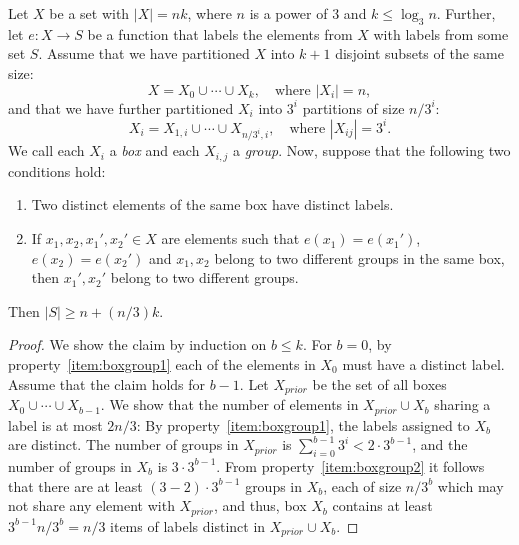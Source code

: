 \begin{lemma}\label{lemma:boxgroups}
Let $X$ be a set with $|X|=nk$, where $n$ is a power of $3$ and $k\leq \log_3 n$. Further, let $e\colon X\to S$ be a function that labels the elements from $X$ with labels from some set $S$. Assume that we have partitioned $X$ into $k+1$ disjoint subsets of the same size:
\[
X=X_0\cup\cdots \cup X_k, \quad \text{where $|X_i|=n$},
\]
and that we have further partitioned $X_i$ into  $3^i$  partitions of size $n/3^i$:
\[
X_i = X_{1,i}\cup\cdots\cup X_{n/3^i,i}, \quad \text{where $|X_{ij}|=3^i$.}
\]
We call each $X_i$ a \emph{box} and each $X_{i,j}$ a \emph{group}. Now, suppose that the following two conditions hold:
\begin{enumerate}[\normalfont (i)]
\item \label{item:boxgroup1} Two distinct elements of the same box have distinct labels.
\item \label{item:boxgroup2} If $x_1,x_2,x_1',x_2'\in X$ are elements such that $e(x_1)=e(x_1')$, $e(x_2)=e(x_2')$ and $x_1,x_2$ belong to two different groups in the same box, then $x_1',x_2'$ belong to two different groups.
\end{enumerate}
Then $|S|\geq n+(n/3)k$.
\end{lemma}
\begin{proof}
We show the claim by induction on $b \leq k$. 
For $b=0$,  by property~\eqref{item:boxgroup1}  each  of the elements in $X_0$ must have a  distinct label.
Assume that the claim holds for $b-1$.
Let $X_{prior}$ be the set of all boxes $X_0 \cup \cdots \cup X_{b-1}$.
We  show that the number of  elements in $X_{prior} \cup X_b$ sharing a label is at most $2n/3$:
 By property~\eqref{item:boxgroup1},  the labels assigned to $X_b$ are distinct.
The number of groups in $X_{prior}$ is $\sum_{i=0}^{b-1} 3^i < 2 \cdot 3^{b-1}$, and the number of groups in $X_b$ is $3 \cdot 3^{b-1}$.
From property~\eqref{item:boxgroup2} it follows that there are at least $(3-2)\cdot 3^{b-1}$ groups in $X_b$, each of size $n/3^b$ which may not share any element with $X_{prior}$, and thus, box $X_b$ contains at least $3^{b-1} n/3^b = n/3$ items of labels distinct in $X_{prior}\cup X_b$. 
\end{proof}



